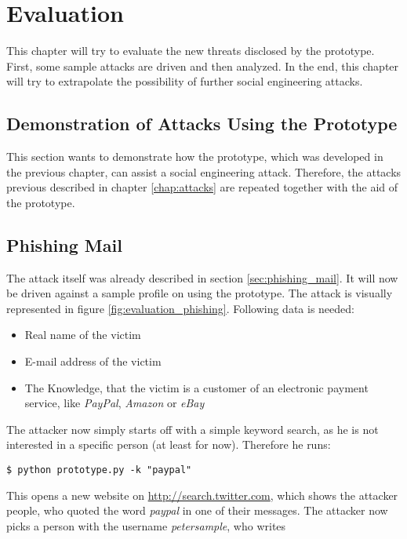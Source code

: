 \chapter{Evaluation}
\label{chap:evaluation}

This chapter will try to evaluate the new threats disclosed by the prototype.
First, some sample attacks are driven and then analyzed. In the end, this
chapter will try to extrapolate the possibility of further social engineering
attacks.

\section{Demonstration of Attacks Using the Prototype}

This section wants to demonstrate how the prototype, which was
developed in the previous chapter, can assist a social engineering attack.
Therefore, the attacks previous described in chapter \ref{chap:attacks} are
repeated together with the aid of the prototype.

\section{Phishing Mail}

The attack itself was already described in section \ref{sec:phishing_mail}. It
will now be driven against a sample profile on \Twitter{} using the prototype.
The attack is visually represented in figure \ref{fig:evaluation_phishing}.
Following data is needed:

\begin{itemize}
  \item Real name of the victim
  \item E-mail address of the victim
  \item The Knowledge, that the victim is a customer of an electronic
  payment service, like \textit{PayPal}, \textit{Amazon} or \textit{eBay}
\end{itemize}

The attacker now simply starts off with a simple keyword search, as he is not
interested in a specific person (at least for now). Therefore he runs:

\lstset{language=bash}
\begin{lstlisting}
$ python prototype.py -k "paypal"
\end{lstlisting}

This opens a new website on \url{http://search.twitter.com}, which shows the
attacker people, who quoted the word \textit{paypal} in one of their messages.
The attacker now picks a person with the username \textit{petersample}, who writes

